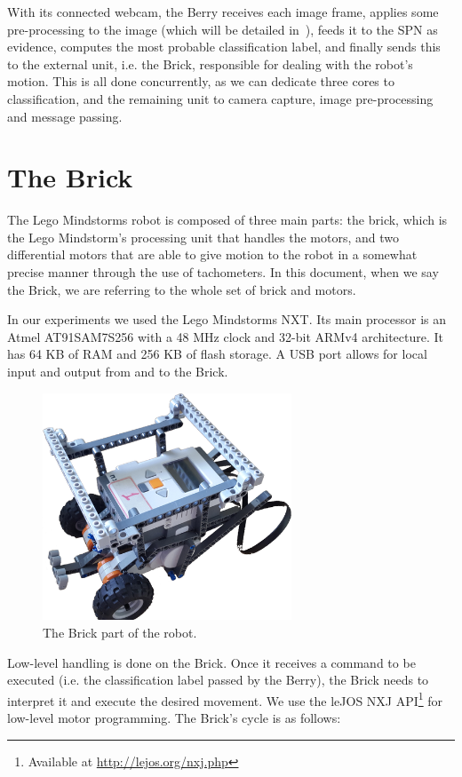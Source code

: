 With its connected webcam, the Berry receives each image frame, applies some pre-processing to the
image (which will be detailed in~), feeds it to the SPN as evidence,
computes the most probable classification label, and finally sends this to the external unit, i.e.
the Brick, responsible for dealing with the robot's motion. This is all done concurrently, as we
can dedicate three cores to classification, and the remaining unit to camera capture, image
pre-processing and message passing.

\section{The Brick}

The Lego Mindstorms robot is composed of three main parts: the brick, which is the Lego Mindstorm's
processing unit that handles the motors, and two differential motors that are able to give motion
to the robot in a somewhat precise manner through the use of tachometers. In this document, when we
say the Brick, we are referring to the whole set of brick and motors.

In our experiments we used the Lego Mindstorms NXT. Its main processor is an Atmel AT91SAM7S256
with a 48 MHz clock and 32-bit ARMv4 architecture. It has 64 KB of RAM and 256 KB of flash storage.
A USB port allows for local input and output from and to the Brick.

\begin{figure}[h]
  \centering\includegraphics[width=0.66\textwidth]{imgs/brick.png}
  \caption{The Brick part of the robot.}
\end{figure}

Low-level handling is done on the Brick. Once it receives a command to be executed (i.e. the
classification label passed by the Berry), the Brick needs to interpret it and execute the desired
movement. We use the leJOS NXJ API\footnote{Available at \url{http://lejos.org/nxj.php}} for
low-level motor programming. The Brick's cycle is as follows:

